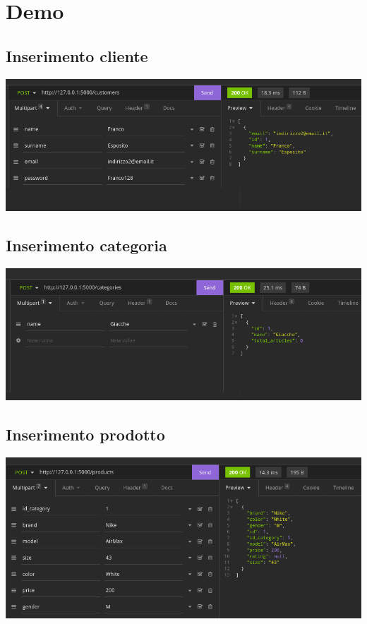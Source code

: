 \section{Demo}

\subsection{Inserimento cliente}

\includegraphics[scale=0.35]{images/inserimento_cliente.png}

\subsection{Inserimento categoria}

\includegraphics[scale=0.35]{images/inserimento_categoria.png}

\subsection{Inserimento prodotto}

\includegraphics[scale=0.35]{images/inserimento_prodotto.png}

